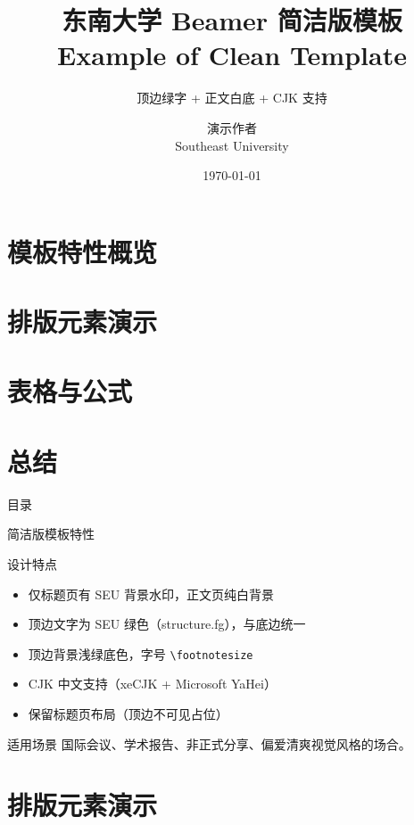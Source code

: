 \documentclass[aspectratio=169, 11pt]{beamer}
\title[简洁版模板示例]{东南大学 Beamer 简洁版模板 \\ Example of Clean Template}
\subtitle{顶边绿字 + 正文白底 + CJK 支持}
\author[演示作者]{演示作者 \\ Southeast University}
\date{\today}
\begin{document}
\begin{frame}
\titlepage
\end{frame}

\section{模板特性概览}
\section{排版元素演示}
\section{表格与公式}
\section{总结}

\plainframetitle
\begin{frame}{目\quad 录}
\tableofcontents
\end{frame}

\begin{frame}{简洁版模板特性}
\begin{block}{设计特点}
  \begin{itemize}
    \item 仅标题页有 SEU 背景水印，正文页纯白背景
    \item 顶边文字为 SEU 绿色（\textcolor{structure.fg}{structure.fg}），与底边统一
    \item 顶边背景浅绿底色，字号 \texttt{\textbackslash footnotesize}
    \item CJK 中文支持（xeCJK + Microsoft YaHei）
    \item 保留标题页布局（顶边不可见占位）
  \end{itemize}
\end{block}

\begin{exampleblock}{适用场景}
  国际会议、学术报告、非正式分享、偏爱清爽视觉风格的场合。
\end{exampleblock}
\end{frame}

\section{排版元素演示}
\end{document}
